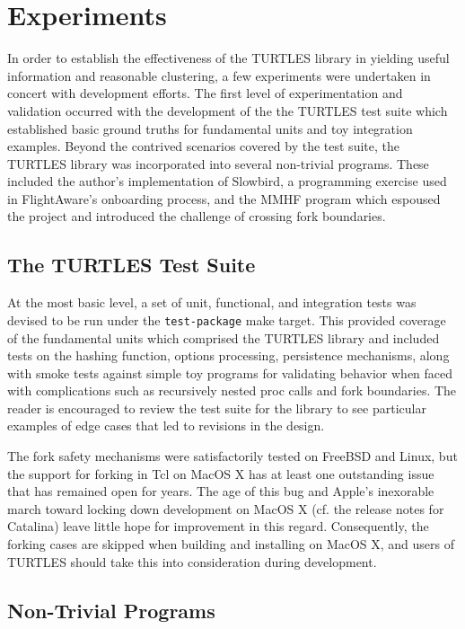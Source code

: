 \documentclass{article}[letter,10pt]
\begin{document}
\section{Experiments}{
  In order to establish the effectiveness of the TURTLES library in yielding useful information and reasonable clustering,
  a few experiments were undertaken in concert with development efforts. The first level of experimentation and validation
  occurred with the development of the the TURTLES test suite which established basic ground truths for fundamental units
  and toy integration examples. Beyond the contrived scenarios covered by the test suite, the TURTLES library was incorporated into
  several non-trivial programs. These included the author's implementation of Slowbird, a programming exercise used
  in FlightAware's onboarding process, and the MMHF program which espoused the project and introduced the challenge of
  crossing fork boundaries.

  \subsection{The TURTLES Test Suite}{
    At the most basic level, a set of unit, functional,
    and integration tests was devised to be run under the \texttt{test-package} make target. This provided coverage of
    the fundamental units which comprised the TURTLES library and included tests on the hashing function, options processing,
    persistence mechanisms, along with smoke tests against simple toy programs for validating behavior when faced with
    complications such as recursively nested proc calls and fork boundaries. The reader is encouraged to review the test
    suite for the library to see particular examples of edge cases that led to revisions in the design.

    The fork safety mechanisms were satisfactorily tested on FreeBSD and Linux, but the support for forking in Tcl on
    MacOS X has at least one outstanding issue that has remained open for years\autocite{c4e230f29b}. The age of this bug and Apple's
    inexorable march toward locking down development on MacOS X (cf. the release notes for Catalina\autocite{scriptsonmac})
    leave little hope for improvement in this regard. Consequently, the forking cases are skipped when building
    and installing on MacOS X, and users of TURTLES should take this into consideration during development.
  }

  \subsection{Non-Trivial Programs}{

}}
\end{document}
